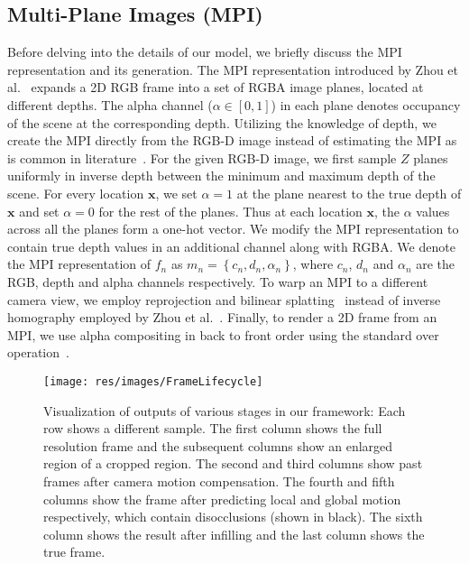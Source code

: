 \documentclass[preprint]{vgtc}
\def\etal{et al.}
\begin{document}
    \subsection{Multi-Plane Images (MPI)}\label{subsec:mpi}
    Before delving into the details of our model, we briefly discuss the MPI representation and its generation.
    The MPI representation introduced by Zhou \etal~\cite{zhou2018stereomag} expands a 2D RGB frame into a set of RGBA image planes, located at different depths.
    The alpha channel ($\alpha \in [0, 1]$) in each plane denotes occupancy of the scene at the corresponding depth.
    Utilizing the knowledge of depth, we create the MPI directly from the RGB-D image instead of estimating the MPI as is common in literature~\cite{zhou2018stereomag,tucker2020single,li2021mine}.
    For the given RGB-D image, we first sample $Z$ planes uniformly in inverse depth between the minimum and maximum depth of the scene.
    For every location $\mathbf{x}$, we set $\alpha=1$ at the plane nearest to the true depth of $\mathbf{x}$ and set $\alpha=0$ for the rest of the planes.
    Thus at each location $\mathbf{x}$, the $\alpha$ values across all the planes form a one-hot vector.
    We modify the MPI representation to contain true depth values in an additional channel along with RGBA\@.
    We denote the MPI representation of $f_n$ as $m_n = \left\{ c_n, d_n, \alpha_n \right\}$, where $c_n$, $d_n$ and $\alpha_n$ are the RGB, depth and alpha channels respectively.
    To warp an MPI to a different camera view, we employ reprojection and bilinear splatting~\cite{tulsiani2018layer,kanchana2022ivp} instead of inverse homography employed by Zhou \etal~\cite{zhou2018stereomag}.
    Finally, to render a 2D frame from an MPI, we use alpha compositing in back to front order using the standard over operation~\cite{zhou2018stereomag}.

    \begin{figure*}
        \centering
        \texttt{[image: res/images/FrameLifecycle]}
        \caption{Visualization of outputs of various stages in our framework: Each row shows a different sample.
        The first column shows the full resolution frame and the subsequent columns show an enlarged region of a cropped region.
        The second and third columns show past frames after camera motion compensation.
        The fourth and fifth columns show the frame after predicting local and global motion respectively, which contain disocclusions (shown in black).
        The sixth column shows the result after infilling and the last column shows the true frame.
        }
        \label{fig:frame-lifecycle}
    \end{figure*}
\end{document}
